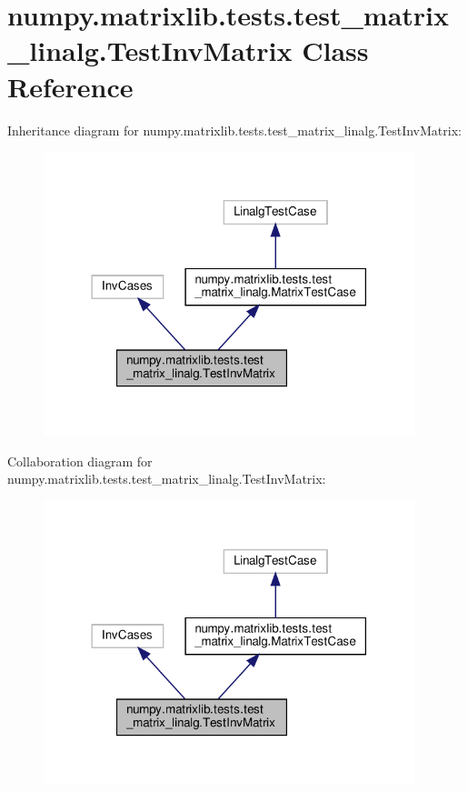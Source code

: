 \hypertarget{classnumpy_1_1matrixlib_1_1tests_1_1test__matrix__linalg_1_1TestInvMatrix}{}\section{numpy.\+matrixlib.\+tests.\+test\+\_\+matrix\+\_\+linalg.\+Test\+Inv\+Matrix Class Reference}
\label{classnumpy_1_1matrixlib_1_1tests_1_1test__matrix__linalg_1_1TestInvMatrix}


Inheritance diagram for numpy.\+matrixlib.\+tests.\+test\+\_\+matrix\+\_\+linalg.\+Test\+Inv\+Matrix\+:
\nopagebreak
\begin{figure}[H]
\begin{center}
\leavevmode
\includegraphics[width=306pt]{classnumpy_1_1matrixlib_1_1tests_1_1test__matrix__linalg_1_1TestInvMatrix__inherit__graph}
\end{center}
\end{figure}


Collaboration diagram for numpy.\+matrixlib.\+tests.\+test\+\_\+matrix\+\_\+linalg.\+Test\+Inv\+Matrix\+:
\nopagebreak
\begin{figure}[H]
\begin{center}
\leavevmode
\includegraphics[width=306pt]{classnumpy_1_1matrixlib_1_1tests_1_1test__matrix__linalg_1_1TestInvMatrix__coll__graph}
\end{center}
\end{figure}
